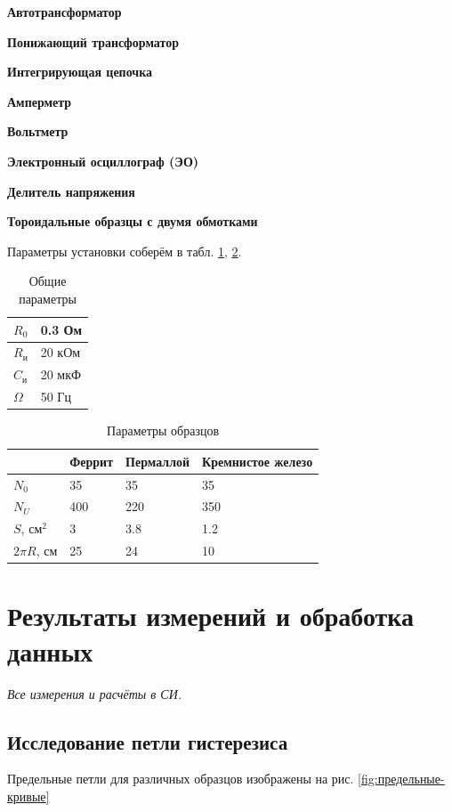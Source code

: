 \documentclass[a4paper]{article}
\newcommand{\picref}[1]{рис. \ref{#1}}
\newcommand{\equip}[1]{
	
	{\bf #1}}
\begin{document}
\equip{Автотрансформатор}
\equip{Понижающий трансформатор}
\equip{Интегрирующая цепочка}
\equip{Амперметр}
\equip{Вольтметр}
\equip{Электронный осциллограф (ЭО)}
\equip{Делитель напряжения}
\equip{Тороидальные образцы с двумя обмотками}

Параметры установки соберём в табл. \ref{уст}, \ref{new}.

\begin{table}[]
	\centering
	\begin{tabular}{|l|l|}
		\hline
		$R_0$    & 0.3 Ом \\ \hline
		$R_и$    & 20 кОм \\ \hline
		$C_и$    & 20 мкФ \\ \hline
		$\Omega$ & 50 Гц  \\ \hline
	\end{tabular}
	\caption{Общие параметры}
	\label{уст}
\end{table}

\begin{table}[]
	\centering
	\begin{tabular}{|l|l|l|l|}
		\hline
		& Феррит & Пермаллой & Кремнистое железо \\ \hline
		$N_0$          & 35     & 35        & 35                \\ \hline
		$N_U$          & 400    & 220       & 350               \\ \hline
		$S$, $см^2$    & 3      & 3.8       & 1.2               \\ \hline
		$2\pi R$, $см$ & 25     & 24        & 10                \\ \hline
	\end{tabular}
	\caption{Параметры образцов}
	\label{new}
\end{table}

\section{Результаты измерений и обработка данных}
\emph{Все измерения и расчёты в СИ.}

\subsection{Исследование петли гистерезиса}

Предельные петли для различных образцов изображены на \picref{fig:предельные-кривые}
\end{document}
